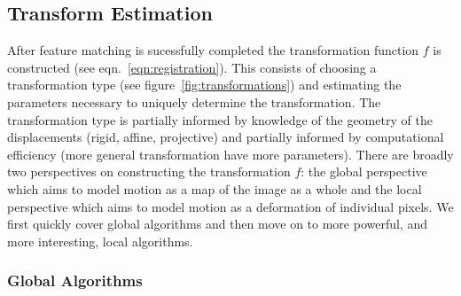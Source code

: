 \subsection{Transform Estimation}

After feature matching is sucessfully completed the transformation function \(f\) is constructed (see eqn.~\eqref{eqn:registration}).
%
This consists of choosing a transformation type (see figure~\ref{fig:transformations}) and estimating the parameters necessary to uniquely determine the transformation.
%
The transformation type is partially informed by knowledge of the geometry of the displacements (rigid, affine, projective) and partially informed by computational efficiency (more general transformation have more parameters).
%
There are broadly two perspectives on constructing the transformation \(f\): the global perspective which aims to model motion as a map of the image as a whole and the local perspective which aims to model motion as a deformation of individual pixels.
%
%
We first quickly cover global algorithms and then move on to more powerful, and more interesting, local algorithms.

\subsubsection{Global Algorithms}

